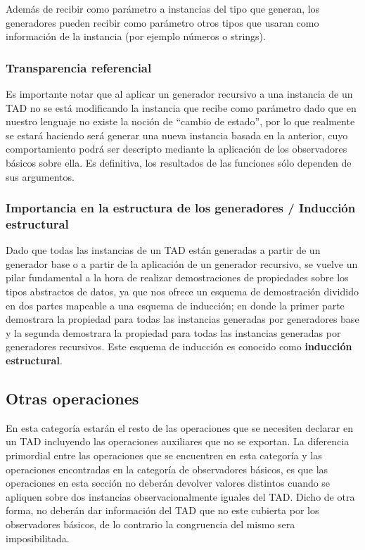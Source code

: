 \documentclass[10pt, a4paper]{report}
\begin{document}
Adem\'as de recibir como par\'ametro a instancias del tipo que generan, los generadores pueden recibir como par\'ametro otros tipos que usaran como informaci\'on de la instancia (por ejemplo n\'umeros o strings). 

\subsubsection*{Transparencia referencial}
Es importante notar que al aplicar un generador recursivo a una instancia de un TAD no se est\'a modificando la instancia que recibe como par\'ametro dado que en nuestro lenguaje no existe la noci\'on de ``cambio de estado'', por lo que realmente se estar\'a haciendo ser\'a generar una nueva instancia basada en la anterior, cuyo comportamiento podr\'a ser descripto mediante la aplicaci\'on de los observadores b\'asicos sobre ella. Es definitiva, los resultados de las funciones s\'olo dependen de sus argumentos.

\subsubsection*{Importancia en la estructura de los generadores / Inducci\'on estructural}
Dado que todas las instancias de un TAD est\'an generadas a partir de un generador base o a partir de la aplicaci\'on de un generador recursivo, se vuelve un pilar fundamental a la hora de realizar demostraciones de propiedades sobre los tipos abstractos de datos, ya que nos ofrece un esquema de demostraci\'on dividido en dos partes mapeable a una esquema de inducci\'on; en donde la primer parte demostrara la propiedad para todas las instancias generadas por generadores base y la segunda demostrara la propiedad para todas las instancias generadas por generadores recursivos. Este esquema de inducci\'on es conocido como \textbf{inducci\'on estructural}.

\subsection{Otras operaciones}

En esta categor\'ia estar\'an el resto de las operaciones que se necesiten declarar en un TAD incluyendo las operaciones auxiliares que no se exportan. La diferencia primordial entre las operaciones que se encuentren en esta categor\'ia y las operaciones encontradas en la categor\'ia de observadores b\'asicos, es que las operaciones en esta secci\'on no deber\'an devolver valores distintos cuando se apliquen sobre dos instancias observacionalmente iguales del TAD. Dicho de otra forma, no deber\'an dar informaci\'on del TAD que no este cubierta por los observadores b\'asicos, de lo contrario la congruencia del mismo sera imposibilitada.
\end{document}
